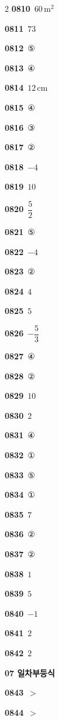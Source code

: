 \documentclass[10pt,a4paper]{article}
\begin{document}
\begin{multicols}{2}
\noindent\textbf{0810}\ $60\,\mathrm{m}^2$\par
\noindent\textbf{0811}\ $73$\par
\noindent\textbf{0812}\ ⑤\par
\noindent\textbf{0813}\ ④\par
\noindent\textbf{0814}\ $12\,\mathrm{cm}$\par
\noindent\textbf{0815}\ ④\par
\noindent\textbf{0816}\ ③\par
\noindent\textbf{0817}\ ②\par
\noindent\textbf{0818}\ $-4$\par
\noindent\textbf{0819}\ $10$\par
\noindent\textbf{0820}\ $\dfrac{5}{2}$\par
\noindent\textbf{0821}\ ⑤\par
\noindent\textbf{0822}\ $-4$\par
\noindent\textbf{0823}\ ②\par
\noindent\textbf{0824}\ $4$\par
\noindent\textbf{0825}\ $5$\par
\noindent\textbf{0826}\ $-\dfrac{5}{3}$\par
\noindent\textbf{0827}\ ④\par
\noindent\textbf{0828}\ ②\par
\noindent\textbf{0829}\ $10$\par
\noindent\textbf{0830}\ $2$\par
\noindent\textbf{0831}\ ④\par
\noindent\textbf{0832}\ ①\par
\noindent\textbf{0833}\ ⑤\par
\noindent\textbf{0834}\ ①\par
\noindent\textbf{0835}\ $7$\par
\noindent\textbf{0836}\ ②\par
\noindent\textbf{0837}\ ②\par
\noindent\textbf{0838}\ $1$\par
\noindent\textbf{0839}\ $5$\par
\noindent\textbf{0840}\ $-1$\par
\noindent\textbf{0841}\ $2$\par
\noindent\textbf{0842}\ $2$\par
\noindent\textbf{07 일차부등식}\par\smallskip
\noindent\textbf{0843}\ $>$\par
\noindent\textbf{0844}\ $>$\par

\end{multicols}
\end{document}
